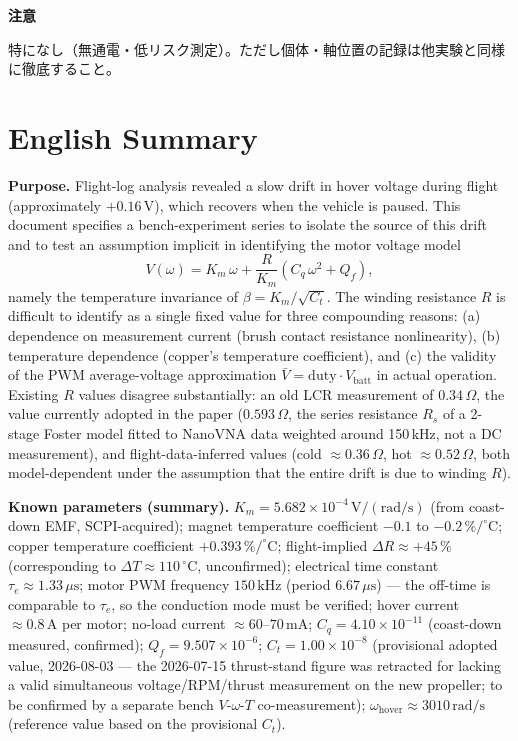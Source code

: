 \documentclass[a4paper,11pt]{ltjsarticle}
\newcommand{\expfield}[1]{\medskip\noindent\textbf{#1}\par\nobreak\smallskip\noindent}
\begin{document}
\expfield{注意}
特になし（無通電・低リスク測定）。ただし個体・軸位置の記録は他実験と同様に徹底すること。

\clearpage
\section*{English Summary}
\small
\noindent
\textbf{Purpose.} Flight-log analysis revealed a slow drift in hover voltage during flight
(approximately $+0.16\,\mathrm{V}$), which recovers when the vehicle is paused. This document
specifies a bench-experiment series to isolate the source of this drift and to test an
assumption implicit in identifying the motor voltage model
\[
V(\omega) = K_m\,\omega + \frac{R}{K_m}\left(C_q\,\omega^2 + Q_f\right),
\]
namely the temperature invariance of $\beta = K_m/\sqrt{C_t}$. The winding resistance $R$ is
difficult to identify as a single fixed value for three compounding reasons: (a) dependence on
measurement current (brush contact resistance nonlinearity), (b) temperature dependence
(copper's temperature coefficient), and (c) the validity of the PWM average-voltage
approximation $\bar V = \mathrm{duty}\cdot V_\mathrm{batt}$ in actual operation. Existing $R$
values disagree substantially: an old LCR measurement of $0.34\,\Omega$, the value currently
adopted in the paper ($0.593\,\Omega$, the series resistance $R_s$ of a 2-stage Foster model fitted to NanoVNA data weighted around 150\,kHz, not a DC measurement), and flight-data-inferred values (cold
$\approx 0.36\,\Omega$, hot $\approx 0.52\,\Omega$, both model-dependent under the assumption
that the entire drift is due to winding $R$).

\textbf{Known parameters (summary).} $K_m = 5.682\times10^{-4}\,\mathrm{V/(rad/s)}$ (from
coast-down EMF, SCPI-acquired); magnet temperature coefficient $-0.1$ to $-0.2\,\%/^\circ\mathrm{C}$;
copper temperature coefficient $+0.393\,\%/^\circ\mathrm{C}$; flight-implied $\Delta R \approx
+45\,\%$ (corresponding to $\Delta T \approx 110\,^\circ\mathrm{C}$, unconfirmed); electrical
time constant $\tau_e \approx 1.33\,\mu\mathrm{s}$; motor PWM frequency $150\,\mathrm{kHz}$
(period $6.67\,\mu\mathrm{s}$) — the off-time is comparable to $\tau_e$, so the conduction mode
must be verified; hover current $\approx 0.8\,\mathrm{A}$ per motor; no-load current
$\approx 60$--$70\,\mathrm{mA}$; $C_q = 4.10\times10^{-11}$ (coast-down measured, confirmed); $Q_f = 9.507\times10^{-6}$;
$C_t = 1.00\times10^{-8}$ (provisional adopted value, 2026-08-03 — the 2026-07-15 thrust-stand figure was retracted for
lacking a valid simultaneous voltage/RPM/thrust measurement on the new propeller; to be confirmed by a separate bench
$V$-$\omega$-$T$ co-measurement); $\omega_\mathrm{hover} \approx 3010\,\mathrm{rad/s}$ (reference value based on the
provisional $C_t$).
\end{document}
